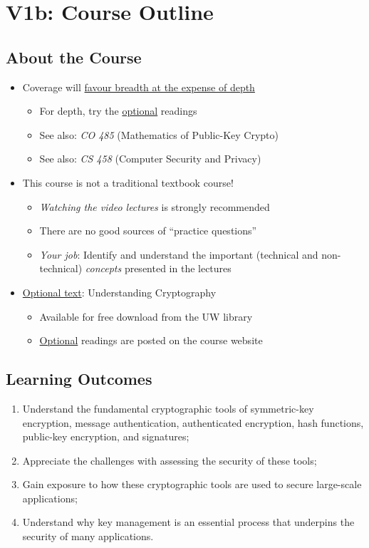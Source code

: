 \section*{V1b: Course Outline}
\setcounter{section}{1}

\subsection*{About the Course}
\begin{itemize}
    \item Coverage will \underline{favour breadth at the expense of depth}
          \begin{itemize}
              \item For depth, try the \underline{optional} readings
              \item See also: \emph{CO 485} (Mathematics of Public-Key Crypto)
              \item See also: \emph{CS 458} (Computer Security and Privacy)
          \end{itemize}
    \item This course is not a traditional textbook course!
          \begin{itemize}
              \item \emph{Watching the video lectures} is strongly recommended
              \item There are no good sources of ``practice questions''
              \item \emph{Your job}: Identify and understand the important (technical
                    and non-technical) \emph{concepts} presented in the lectures
          \end{itemize}
    \item \underline{Optional text}: Understanding Cryptography
          \begin{itemize}
              \item Available for free download from the UW library
              \item \underline{Optional} readings are posted on the course website
          \end{itemize}
\end{itemize}
\subsection*{Learning Outcomes}
\begin{enumerate}
    \item Understand the fundamental cryptographic tools of
          symmetric-key encryption, message authentication,
          authenticated encryption, hash functions, public-key
          encryption, and signatures;
    \item Appreciate the challenges with assessing the security
          of these tools;
    \item Gain exposure to how these cryptographic tools are
          used to secure large-scale applications;
    \item Understand why key management is an essential
          process that underpins the security of many
          applications.
\end{enumerate}
